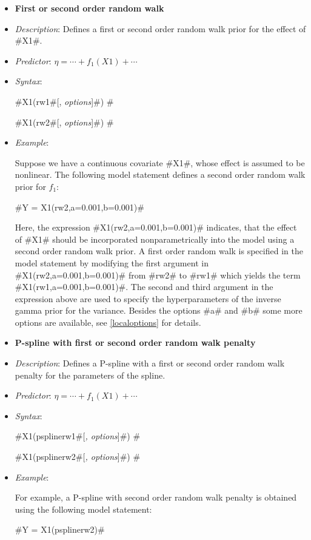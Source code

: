 \begin{itemize}
 \item[]{\bf\sffamily First or second order random walk}
 \item[]{\em Description}: Defines a first or second order random walk
 prior for the effect of #X1#.
 \item[]{\em Predictor}: $\eta = \cdots + f_1(X1) + \cdots $
 \item[] {\em Syntax}:

#X1(rw1#[, {\em options}]#) #

#X1(rw2#[, {\em options}]#) #
\item[] {\em Example}:

Suppose we have a continuous covariate #X1#, whose effect is
assumed to be nonlinear. The following model statement defines a
second order random walk prior for $f_1$:

#Y = X1(rw2,a=0.001,b=0.001)#

Here, the expression #X1(rw2,a=0.001,b=0.001)# indicates, that the
effect of #X1# should be incorporated nonparametrically into the
model using a second order random walk prior. A first order random
walk is specified in the model statement by modifying the first
argument in #X1(rw2,a=0.001,b=0.001)# from #rw2# to #rw1# which
yields the term #X1(rw1,a=0.001,b=0.001)#. The second and third
argument in the expression above are used to specify the
hyperparameters of the inverse gamma prior for the variance.
Besides the options #a# and #b# some more options are available,
see \autoref{localoptions} for details.

\item[] {\bf\sffamily P-spline with first or second order random
walk penalty}

\item[] {\em Description}: Defines a P-spline with a first or
second order random walk penalty for the parameters of the spline.
\item[] {\em Predictor}: $\eta =  \cdots + f_1(X1) + \cdots$
\item[] {\em Syntax}:

#X1(psplinerw1#[{\em , options}]#) #

#X1(psplinerw2#[{\em , options}]#) #
\item[] {\em Example}:

For example, a P-spline with second order random walk penalty is
obtained using the following model statement:

#Y = X1(psplinerw2)#


\end{itemize}

